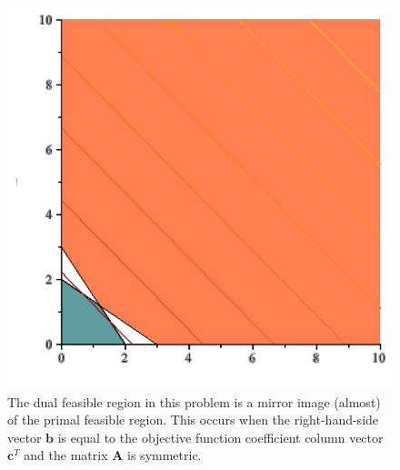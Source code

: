 \begin{figure}[htbp]
\centering
\includegraphics[scale=0.5]{PrimalDualFeasibleRegion-1.pdf}
\caption{The dual feasible region in this problem is a mirror image (almost) of the primal feasible region. This occurs when the right-hand-side vector $\mathbf{b}$ is equal to the objective function coefficient column vector $\mathbf{c}^T$ and the matrix $\mathbf{A}$ is symmetric.}
\label{fig:PrimalDualFeasibleRegion-1} 
\end{figure}

